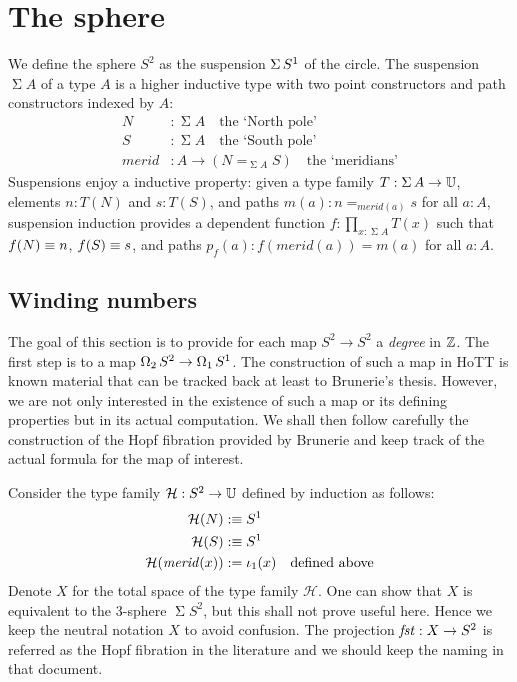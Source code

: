 \documentclass[english,a4]{article}
\def\U{\universe U}%
\begin{document}
\section{The sphere}
\newcommand{\Sp}{S^2}%
\newcommand{\mrd}{\mathit{merid}}%
\newcommand{\susp}[1]{\operatorname{\Sigma}{#1}}%
%
We define the sphere $\Sp$ as the suspension $\susp\Sc$ of the circle.
The suspension $\susp A$ of a type $A$ is a higher inductive type 
with two point constructors and path constructors indexed by $A$:
\begin{align}
  \label{eq:suspension}
  N &: \susp A \quad\text{the `North pole'}\\
  S &: \susp A \quad\text{the `South pole'}\\
  \mrd &: A \to (N =_{\susp A} S) \quad\text{the `meridians'}
\end{align}
Suspensions enjoy a inductive property: given a type family
$T : \susp A \to \U$, elements $n:T(N)$ and $s:T(S)$, and paths
$m(a) : n=_{\mrd(a)}s$ for all $a:A$, 
suspension induction provides a dependent
function $f : \prod_{x:\susp A}T(x)$ such that $f(N) \equiv n$, $f(S) \equiv s$,
and paths $p_f(a): f(\mrd(a)) = m(a)$ for all $a:A$.

\subsection{Winding numbers}
\label{sec:winding-numbers}
\def\hopffam{\mathcal H}%
\def\loopspace#1{\operatorname{\Omega_{#1}}}%

The goal of this section is to provide for each map $\Sp \to \Sp$ a
{\em degree} in $\mathbb{Z}$. The first step is to a map
$\loopspace 2 \Sp \to \loopspace 1 \Sc$. The construction of such a
map in HoTT is known material that can be tracked back at least to
Brunerie's thesis. However, we are not only interested in the
existence of such a map or its defining properties but in its actual
computation. We shall then follow carefully the construction of the
Hopf fibration provided by Brunerie and keep track of the actual
formula for the map of interest.

Consider the type family $\hopffam : \Sp \to \U$ defined by induction
as follows:
\begin{equation}
  \label{eq:7}
  \begin{aligned}
    \hopffam (N) &\defequi \Sc
    \\
    \hopffam (S) &\defequi \Sc
    \\
    \hopffam (\mrd(x)) &\defis \iota_1(x) \quad\text{defined above}
  \end{aligned}
\end{equation}
Denote $X$ for the total space of the type family $\hopffam$. One can
show that $X$ is equivalent to the 3-sphere $\susp \Sp$, but this
shall not prove useful here. Hence we keep the neutral notation $X$ to
avoid confusion. The projection $\fst : X\to \Sp$ is referred as the
Hopf fibration in the literature and we should keep the naming in that
document.
\end{document}

